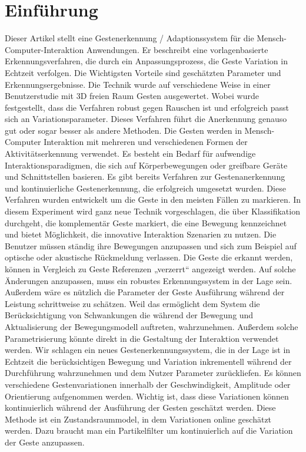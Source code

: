 \documentclass{llncs}
\begin{document}
\section{Einführung}
Dieser Artikel stellt eine Gestenerkennung / Adaptionssystem für die Mensch-Computer-Interaktion Anwendungen. Er beschreibt eine vorlagenbasierte Erkennungsverfahren, die durch ein Anpassungsprozess, die Geste Variation in Echtzeit verfolgen. Die Wichtigsten Vorteile sind geschätzten Parameter und Erkennungsergebnisse. Die Technik wurde auf verschiedene Weise in einer Benutzerstudie mit 3D freien Raum Gesten ausgewertet. Wobei wurde festgestellt, dass die Verfahren robust gegen Rauschen ist und erfolgreich passt sich an Variationsparameter. Dieses Verfahren führt die Anerkennung genauso gut oder sogar besser als andere Methoden.
Die Gesten werden in Mensch-Computer Interaktion mit mehreren und verschiedenen Formen der Aktivitätserkennung verwendet. Es besteht ein Bedarf  für aufwendige Interaktionsparadigmen, die sich auf Körperbewegungen oder greifbare Geräte und Schnittstellen basieren. Es gibt bereits Verfahren zur Gestenanerkennung und kontinuierliche Gestenerkennung, die erfolgreich umgesetzt wurden. Diese Verfahren wurden entwickelt um die Geste in den meisten Fällen zu markieren. In diesem Experiment wird ganz neue Technik vorgeschlagen, die über Klassifikation durchgeht, die komplementär Geste markiert, die eine Bewegung kennzeichnet und bietet Möglichkeit, die innovative Interaktion Szenarien zu nutzen.
Die Benutzer müssen  ständig ihre Bewegungen anzupassen und sich zum Beispiel auf optische oder akustische Rückmeldung verlassen. Die Geste die erkannt werden, können in Vergleich zu Geste Referenzen „verzerrt“ angezeigt werden. Auf solche Änderungen anzupassen, muss ein robustes Erkennungssystem in der Lage sein. Außerdem wäre es nützlich die Parameter der Geste Ausführung während der Leistung schrittweise zu schätzen. Weil das ermöglicht dem System die Berücksichtigung von Schwankungen die während der Bewegung und Aktualisierung der Bewegungsmodell auftreten,  wahrzunehmen. Außerdem solche Parametrisierung  könnte direkt in die Gestaltung der Interaktion verwendet werden.
Wir schlagen ein neues Gestenerkennungssystem, die in der Lage ist in Echtzeit die berücksichtigen Bewegung und Variation inkrementell während der Durchführung wahrzunehmen und dem Nutzer Parameter zurückliefen. Es können verschiedene Gestenvariationen innerhalb der Geschwindigkeit, Amplitude oder Orientierung aufgenommen werden. Wichtig ist, dass diese Variationen können kontinuierlich während der Ausführung der Gesten geschätzt werden. Diese Methode ist ein Zustandsraummodel, in dem Variationen online geschätzt werden. Dazu braucht man ein Partikelfilter um kontinuierlich auf die Variation der Geste anzupassen.
\end{document}

